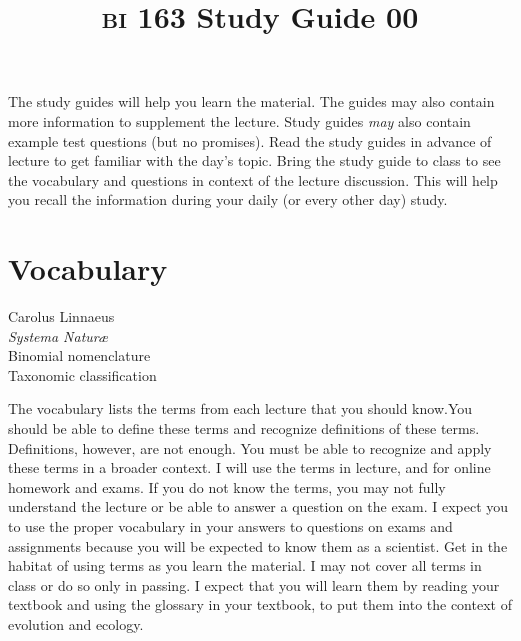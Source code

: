 \documentclass[letterpaper]{tufte-handout}
\title{{\scshape bi} 163 Study Guide 00\hfill}
\date{} %
\begin{document}
\maketitle	%



The study guides will help you learn the material. The guides may also contain more information to supplement the lecture. Study guides \emph{may} also contain example test questions (but no promises).  Read the study guides in advance of lecture to get familiar with the day's topic. Bring the study guide to class to see the vocabulary and questions in context of the lecture discussion. This will help you recall the information during your daily (or every other day) study.

\section{Vocabulary} 

\vspace{-1\baselineskip}
\begin{multicols}{2}
Carolus Linnaeus\\
\textit{Systema Natur\ae}\\
Binomial nomenclature\\
Taxonomic classification
\end{multicols}

The vocabulary lists the terms from each lecture that you should know.You should be able to define these terms and recognize definitions of these terms. Definitions, however, are not enough. You must be able to recognize and apply these terms in a broader context.  I will use the terms in lecture, and for online homework and exams. If you do not know the terms, you may not fully understand the lecture or be able to answer a question on the exam. I expect you to use the proper vocabulary in your answers to questions on exams and assignments because you will be expected to know them as a scientist.  Get in the habitat of using terms as you learn the material.  I may not cover all terms in class or do so only in passing.  I expect that you will learn them by reading your textbook and using the glossary in your textbook, to put them into the context of evolution and ecology. 
\end{document}
